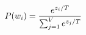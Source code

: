 \documentclass[preview]{standalone}
\begin{document}
\begin{align*}
\special{dvisvgm:raw <g id='unique000'>}P(w_i)=\frac{e^{z_i/T}}{\sum_{j=1}^{V} e^{z_j/T}}\special{dvisvgm:raw </g>}
\end{align*}
\end{document}
